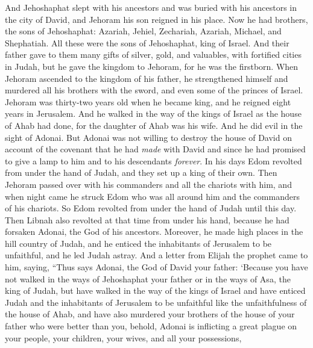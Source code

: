 \begin{biblechapter} %
 And Jehoshaphat slept with his ancestors and was buried with his ancestors in the city of David, and Jehoram his son reigned in his place.
\verse Now he had brothers, the sons of Jehoshaphat: Azariah, Jehiel, Zechariah, Azariah, Michael, and Shephatiah. All these were the sons of Jehoshaphat, king of Israel.
\verse And their father gave to them many gifts of silver, gold, and valuables, with fortified cities in Judah, but he gave the kingdom to Jehoram, for he was the firstborn.
\verse When Jehoram ascended to the kingdom of his father, he strengthened himself and murdered all his brothers with the sword, and even some of the princes of Israel.
\verse Jehoram was thirty-two years old when he became king, and he reigned eight years in Jerusalem.
\verse And he walked in the way of the kings of Israel as the house of Ahab had done, for the daughter of Ahab was his wife. And he did evil in the sight of Adonai.
\verse But Adonai was not willing to destroy the house of David on account of the covenant that he had \textit{made} with David and since he had promised to give a lamp to him and to his descendants \textit{forever}.
\verse In his days Edom revolted from under the hand of Judah, and they set up a king of their own.
\verse Then Jehoram passed over with his commanders and all the chariots with him, and when night came he struck Edom who was all around him and the commanders of his chariots.
\verse So Edom revolted from under the hand of Judah until this day. Then Libnah also revolted at that time from under his hand, because he had forsaken Adonai, the God of his ancestors.
\verse Moreover, he made high places in the hill country of Judah, and he enticed the inhabitants of Jerusalem to be unfaithful, and he led Judah astray.
\verse And a letter from Elijah the prophet came to him, saying, “Thus says Adonai, the God of David your father: ‘Because you have not walked in the ways of Jehoshaphat your father or in the ways of Asa, the king of Judah,
\verse but have walked in the way of the kings of Israel and have enticed Judah and the inhabitants of Jerusalem to be unfaithful like the unfaithfulness of the house of Ahab, and have also murdered your brothers of the house of your father who were better than you,
\verse behold, Adonai is inflicting a great plague on your people, your children, your wives, and all your possessions,

\end{biblechapter}
